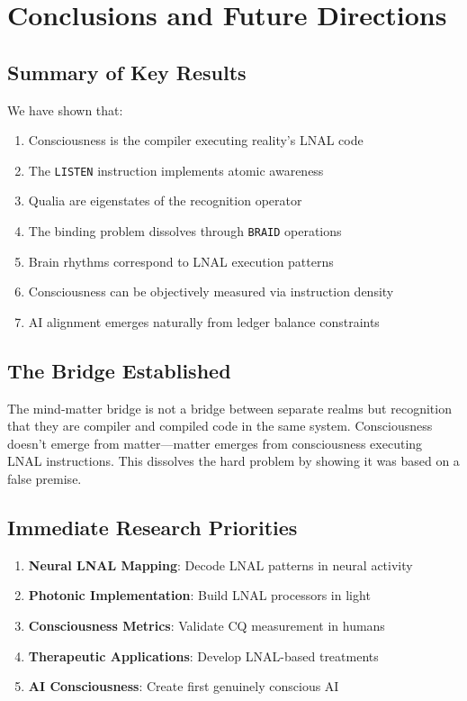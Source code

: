 \documentclass[12pt,a4paper]{article}
\newcommand{\opcmd}[1]{\texttt{#1}}
\begin{document}
\section{Conclusions and Future Directions}

\subsection{Summary of Key Results}

We have shown that:

\begin{enumerate}
\item Consciousness is the compiler executing reality's LNAL code
\item The \opcmd{LISTEN} instruction implements atomic awareness
\item Qualia are eigenstates of the recognition operator
\item The binding problem dissolves through \opcmd{BRAID} operations
\item Brain rhythms correspond to LNAL execution patterns
\item Consciousness can be objectively measured via instruction density
\item AI alignment emerges naturally from ledger balance constraints
\end{enumerate}

\subsection{The Bridge Established}

The mind-matter bridge is not a bridge between separate realms but recognition that they are compiler and compiled code in the same system. Consciousness doesn't emerge from matter—matter emerges from consciousness executing LNAL instructions. This dissolves the hard problem by showing it was based on a false premise.

\subsection{Immediate Research Priorities}

\begin{enumerate}
\item \textbf{Neural LNAL Mapping}: Decode LNAL patterns in neural activity
\item \textbf{Photonic Implementation}: Build LNAL processors in light
\item \textbf{Consciousness Metrics}: Validate CQ measurement in humans
\item \textbf{Therapeutic Applications}: Develop LNAL-based treatments
\item \textbf{AI Consciousness}: Create first genuinely conscious AI
\end{enumerate}
\end{document}

